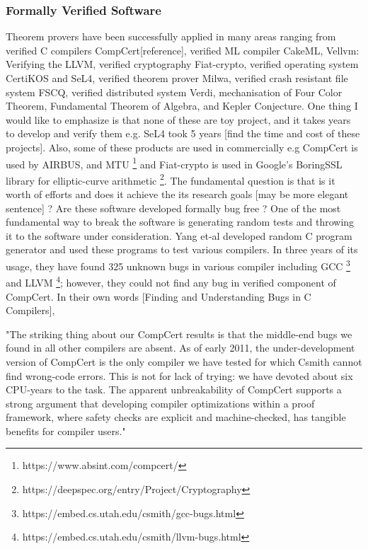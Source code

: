 	\subsubsection{Formally Verified Software}
	Theorem provers have been successfully applied in many areas ranging 
	from verified C compilers CompCert[reference], verified ML compiler
	CakeML, Vellvm: Verifying the LLVM, verified cryptography 
	Fiat-crypto, verified 
	operating system CertiKOS and SeL4, verified theorem prover Milwa, 
	verified crash resistant file system FSCQ, verified distributed system 
	Verdi, mechanisation of Four Color Theorem, Fundamental Theorem of 
	Algebra, and Kepler Conjecture.  One thing I would like to emphasize 
	is that none of these are toy project, and it takes years 
	to develop and verify them e.g. SeL4 took 5 years [find the time and 
	cost of these projects]. Also, some of these products 
	are used in commercially e.g CompCert is used by AIRBUS, and MTU
	\footnote{https://www.absint.com/compcert/} and Fiat-crypto is used 
	in Google's BoringSSL library for elliptic-curve arithmetic 
	\footnote{https://deepspec.org/entry/Project/Cryptography}. 
	The fundamental question 
	is that is it worth of efforts and does it achieve the its 
	research goals [may be more elegant sentence] ? Are 
	these software developed formally bug free ? 
	One of the most fundamental way to 
	break the software is generating random tests and throwing it to 
	the software under consideration. Yang et-al developed random 
	C program generator and used these programs to test various 
	compilers. In three years of its usage, they have found 325 unknown
	bugs in various compiler including GCC
	\footnote{https://embed.cs.utah.edu/csmith/gcc-bugs.html} and LLVM
	\footnote{https://embed.cs.utah.edu/csmith/llvm-bugs.html}; however, 
	they could not find any bug in verified component of CompCert. 
	In their own words [Finding and Understanding Bugs in C Compilers],
	
	"The striking thing about our CompCert results is that the middle-end 
	bugs we found in all other compilers are absent. As of early 2011,
	the under-development version of CompCert is the only compiler we
	have tested for which Csmith cannot find wrong-code errors. This is
	not for lack of trying: we have devoted about six CPU-years to the
	task. The apparent unbreakability of CompCert supports a strong
	argument that developing compiler optimizations within a proof
	framework, where safety checks are explicit and machine-checked,
	has tangible benefits for compiler users."
	
